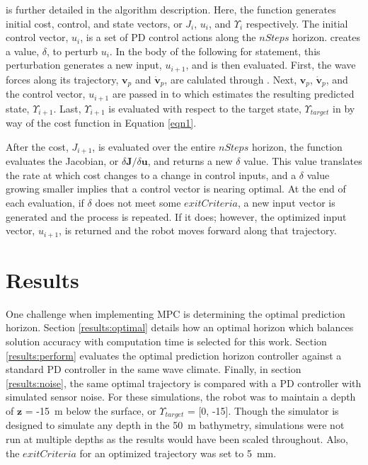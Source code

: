 \documentclass[letterpaper, 10pt, conference]{IEEEtran}
\renewcommand{\vec}[1]{\mathbf{#1}}
\begin{document}
 is further detailed in the algorithm description. Here, the function  generates initial cost, control, and state vectors, or $J_i$, $u_i$, and $\Upsilon_i$ respectively. The initial control vector, $u_i$, is a set of PD control actions along the $nSteps$ horizon.  creates a value, $\delta$, to perturb $u_i$. In the body of the following for statement, this perturbation generates a new input, $u_{i+1}$, and is then evaluated. First, the wave forces along its trajectory, $\vec{v}_p$ and $\dot{\vec{v}}_p$, are calulated through . Next, $\vec{v}_p$, $\dot{\vec{v}}_p$, and the control vector, $u_{i+1}$ are passed in to  which estimates the resulting predicted state, $\Upsilon_{i+1}$. Last, $\Upsilon_{i+1}$ is evaluated with respect to the target state, $\Upsilon_{target}$ in  by way of the cost function in Equation \ref{eqn1}.

After the cost, $J_{i+1}$, is evaluated over the entire $nSteps$ horizon, the function  evaluates the Jacobian, or $\delta \vec{J} / \delta \vec{u}$, and returns a new $\delta$ value. This value translates the rate at which cost changes to a change in control inputs, and a $\delta$ value growing smaller implies that a control vector is nearing optimal.  At the end of each evaluation, if $\delta$ does not meet some $exitCriteria$, a new input vector is generated and the process is repeated. If it does; however, the optimized input vector, $u_{i+1}$, is returned and the robot moves forward along that trajectory. 

\section{Results} 
\label{sec:results}

One challenge when implementing MPC is determining the optimal prediction horizon. Section \ref{results:optimal} details how an optimal horizon which balances solution accuracy with computation time is selected for this work. Section \ref{results:perform} evaluates the optimal prediction horizon controller against a standard PD controller in the same wave climate. Finally, in section \ref{results:noise}, the same optimal trajectory is compared with a PD controller with simulated sensor noise. For these simulations, the robot was to maintain a depth of $\vec{z}$ = -15~m below the surface, or $\Upsilon_{target}$ = [0, -15]. Though the simulator is designed to simulate any depth in the 50~m bathymetry, simulations were not run at multiple depths as the results would have been scaled throughout. Also, the $exitCriteria$ for an optimized trajectory was set to 5~mm. 
\end{document}
